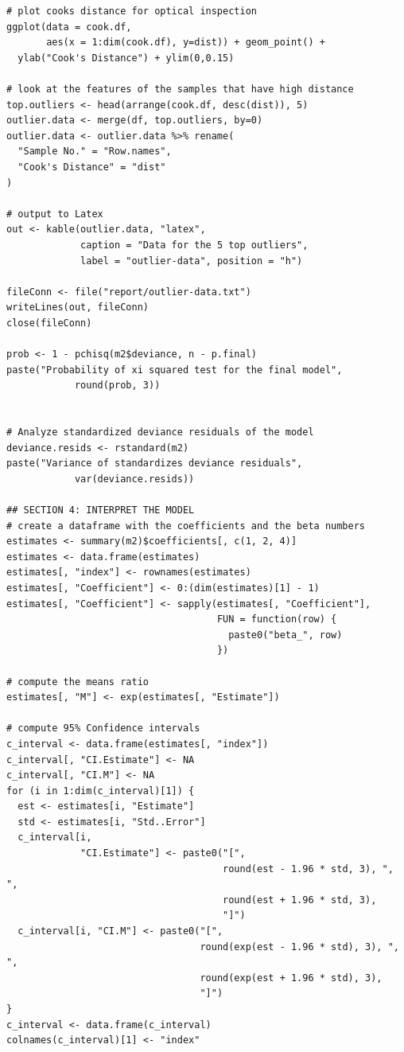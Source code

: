 \documentclass[a4paper,11pt]{article}
\begin{document}
\begin{verbatim}
# plot cooks distance for optical inspection
ggplot(data = cook.df,
       aes(x = 1:dim(cook.df), y=dist)) + geom_point() +
  ylab("Cook's Distance") + ylim(0,0.15)

# look at the features of the samples that have high distance
top.outliers <- head(arrange(cook.df, desc(dist)), 5)
outlier.data <- merge(df, top.outliers, by=0)
outlier.data <- outlier.data %>% rename(
  "Sample No." = "Row.names",
  "Cook's Distance" = "dist"
)

# output to Latex
out <- kable(outlier.data, "latex",
             caption = "Data for the 5 top outliers",
             label = "outlier-data", position = "h")

fileConn <- file("report/outlier-data.txt")
writeLines(out, fileConn)
close(fileConn)

prob <- 1 - pchisq(m2$deviance, n - p.final)
paste("Probability of xi squared test for the final model",
            round(prob, 3))


# Analyze standardized deviance residuals of the model
deviance.resids <- rstandard(m2)
paste("Variance of standardizes deviance residuals",
            var(deviance.resids))

## SECTION 4: INTERPRET THE MODEL
# create a dataframe with the coefficients and the beta numbers
estimates <- summary(m2)$coefficients[, c(1, 2, 4)]
estimates <- data.frame(estimates)
estimates[, "index"] <- rownames(estimates)
estimates[, "Coefficient"] <- 0:(dim(estimates)[1] - 1)
estimates[, "Coefficient"] <- sapply(estimates[, "Coefficient"],
                                     FUN = function(row) {
                                       paste0("beta_", row)
                                     })

# compute the means ratio
estimates[, "M"] <- exp(estimates[, "Estimate"])

# compute 95% Confidence intervals
c_interval <- data.frame(estimates[, "index"])
c_interval[, "CI.Estimate"] <- NA
c_interval[, "CI.M"] <- NA
for (i in 1:dim(c_interval)[1]) {
  est <- estimates[i, "Estimate"]
  std <- estimates[i, "Std..Error"]
  c_interval[i,
             "CI.Estimate"] <- paste0("[",
                                      round(est - 1.96 * std, 3), ", ",
                                      round(est + 1.96 * std, 3),
                                      "]")
  c_interval[i, "CI.M"] <- paste0("[",
                                  round(exp(est - 1.96 * std), 3), ", ",
                                  round(exp(est + 1.96 * std), 3),
                                  "]")
}
c_interval <- data.frame(c_interval)
colnames(c_interval)[1] <- "index"


\end{verbatim}
\end{document}
